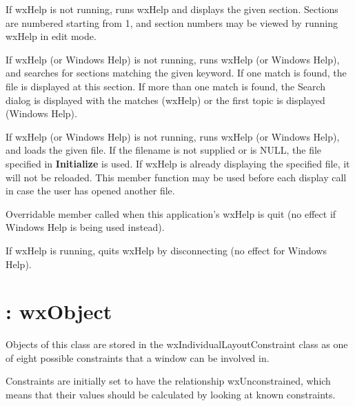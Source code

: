 If wxHelp is not running, runs wxHelp and displays the given section.
Sections are numbered starting from 1, and section numbers may be viewed by running
wxHelp in edit mode.



If wxHelp (or Windows Help) is not running, runs wxHelp (or Windows
Help), and searches for sections matching the given keyword. If one
match is found, the file is displayed at this section. If more than one
match is found, the Search dialog is displayed with the matches (wxHelp)
or the first topic is displayed (Windows Help).



If wxHelp (or Windows Help) is not running, runs wxHelp (or Windows
Help), and loads the given file. If the filename is not supplied or is
NULL, the file specified in {\bf Initialize} is used. If wxHelp is
already displaying the specified file, it will not be reloaded. This
member function may be used before each display call in case the user
has opened another file.



Overridable member called when this application's wxHelp is quit
(no effect if Windows Help is being used instead).



If wxHelp is running, quits wxHelp by disconnecting (no effect for Windows
Help).

\section{: wxObject}\label{wxindividuallayoutconstraint}


Objects of this class are stored in the wxIndividualLayoutConstraint class
as one of eight possible constraints that a window can be involved in.

Constraints are initially set to have the relationship wxUnconstrained,
which means that their values should be calculated by looking at known constraints.

